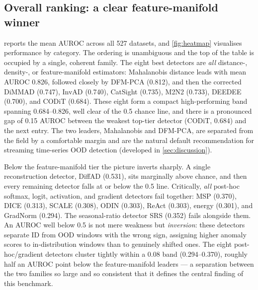 \subsection{Overall ranking: a clear feature-manifold winner}\label{sec:results-overall}
 reports the mean AUROC across all \num{527} datasets, and
\cref{fig:heatmap} visualises performance by category. The ordering is
unambiguous and the top of the table is occupied by a single, coherent family.
The eight best detectors are \emph{all} distance-, density-, or
feature-manifold estimators: Mahalanobis distance leads with mean AUROC
\num{0.826}, followed closely by DFM-PCA (\num{0.812}), and then the corrected
DiMMAD (\num{0.747}), InvAD (\num{0.740}), CatSight (\num{0.735}), M2N2
(\num{0.733}), DEEDEE (\num{0.700}), and CODiT (\num{0.684}). These eight form a
compact high-performing band spanning \numrange{0.684}{0.826}, well clear of the
\num{0.5} chance line, and there is a pronounced gap of \num{0.15} AUROC between
the weakest top-tier detector (CODiT, \num{0.684}) and the next entry. The two
leaders, Mahalanobis and DFM-PCA, are separated from the field by a comfortable
margin and are the natural default recommendation for streaming time-series OOD
detection (developed in \cref{sec:discussion}).

Below the feature-manifold tier the picture inverts sharply. A single
reconstruction detector, DiffAD (\num{0.531}), sits marginally above chance, and
then every remaining detector falls at or below the \num{0.5} line. Critically,
\emph{all} post-hoc softmax, logit, activation, and gradient detectors fail
together: MSP (\num{0.370}), DICE (\num{0.313}), SCALE (\num{0.308}), ODIN
(\num{0.303}), ReAct (\num{0.303}), energy (\num{0.301}), and GradNorm
(\num{0.294}). The seasonal-ratio detector SRS (\num{0.352}) fails alongside
them. An AUROC well below \num{0.5} is not mere weakness but \emph{inversion}:
these detectors separate ID from OOD windows with the wrong sign, assigning
higher anomaly scores to in-distribution windows than to genuinely shifted ones.
The eight post-hoc/gradient detectors cluster tightly within a \num{0.08} band
(\numrange{0.294}{0.370}), roughly half an AUROC point below the feature-manifold
leaders --- a separation between the two families so large and so consistent
that it defines the central finding of this benchmark.



